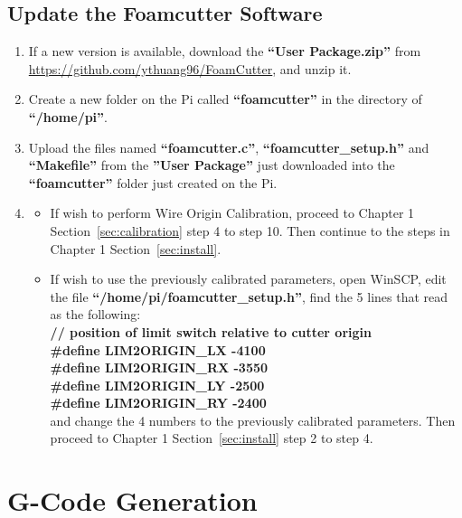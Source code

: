 \documentclass[titlepage,12pt,letter]{report}
\numberwithin{equation}{chapter}
\begin{document}
\subsection{Update the Foamcutter Software}
\begin{enumerate}[noitemsep,topsep=0pt]
\item If a new version is available, download the \textbf{``User Package.zip''} from \\ \href{https://github.com/ythuang96/FoamCutter}{https://github.com/ythuang96/FoamCutter}, and unzip it.
\item Create a new folder on the Pi called \textbf{``foamcutter''} in the directory of \textbf{``/home/pi''}. 
\item Upload the files named \textbf{``foamcutter.c''}, \textbf{``foamcutter\_setup.h''} and \textbf{``Makefile''} from the \textbf{''User Package''} just downloaded into the \textbf{``foamcutter''} folder just created on the Pi.
\item \begin{itemize}[noitemsep,topsep=0pt]
	\item If wish to perform Wire Origin Calibration, proceed to Chapter 1 Section~\ref{sec:calibration} step 4 to step 10. Then continue to the steps in Chapter 1 Section~\ref{sec:install}. 
\item If wish to use the previously calibrated parameters, open WinSCP, edit the file \textbf{``/home/pi/foamcutter\_setup.h''}, find the 5 lines that read as the following:\\
\textbf{// position of limit switch relative to cutter origin}\\
\textbf{\#define LIM2ORIGIN\_LX -4100}\\
\textbf{\#define LIM2ORIGIN\_RX -3550}\\
\textbf{\#define LIM2ORIGIN\_LY -2500}\\
\textbf{\#define LIM2ORIGIN\_RY -2400}\\
and change the 4 numbers to the previously calibrated parameters. Then proceed to Chapter 1 Section~\ref{sec:install} step 2 to step 4.
\end{itemize}
\end{enumerate}


\section{G-Code Generation}
\label{sec:gcode}
\end{document}
